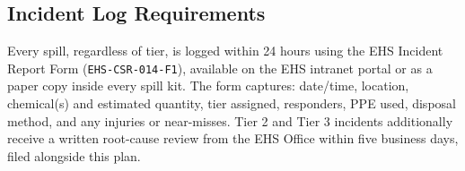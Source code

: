 \subsection*{Incident Log Requirements}
Every spill, regardless of tier, is logged within 24 hours using the EHS Incident Report Form
(\texttt{EHS-CSR-014-F1}), available on the EHS intranet portal or as a paper copy inside every
spill kit. The form captures: date/time, location, chemical(s) and estimated quantity, tier
assigned, responders, PPE used, disposal method, and any injuries or near-misses. Tier 2 and
Tier 3 incidents additionally receive a written root-cause review from the EHS Office within
five business days, filed alongside this plan.
